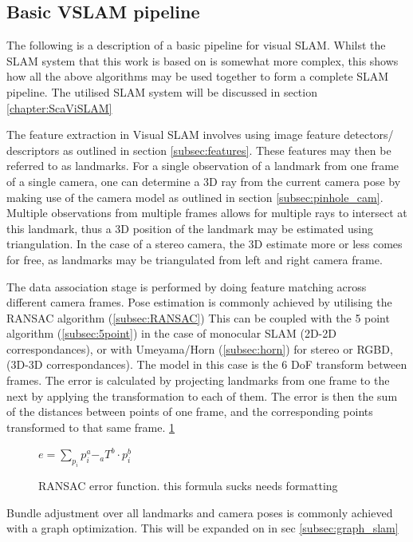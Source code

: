 \subsection{Basic VSLAM pipeline}

The following is a description of a basic pipeline for visual SLAM.  Whilst the SLAM system that
this work is based on is somewhat more complex, this shows how all the above algorithms may be used
together to form a complete SLAM pipeline.  The utilised SLAM system will be discussed in section
\ref{chapter:ScaViSLAM}

The feature extraction in Visual SLAM involves using image feature detectors/ descriptors as
outlined in section \ref{subsec:features}.  These features may then be referred to as
landmarks. For a single observation of a landmark from one frame of a single camera, one can
determine a 3D ray from the current camera pose by making use of the camera model as outlined in
section \ref{subsec:pinhole_cam}.  Multiple observations from multiple frames allows for multiple
rays to intersect at this landmark, thus a 3D position of the landmark may be estimated using
triangulation. In the case of a stereo camera, the 3D estimate more or less comes for free, as
landmarks may be triangulated from left and right camera frame.

The data association stage is performed by doing feature matching across different camera frames.
Pose estimation is commonly achieved by utilising the RANSAC algorithm (\ref{subsec:RANSAC}) 
This can be coupled with the 5 point algorithm (\ref{subsec:5point}) in the case of monocular SLAM
(2D-2D correspondances), or with Umeyama/Horn (\ref{subsec:horn}) for stereo or RGBD, (3D-3D
correspondances). The model in this case is the 6 DoF transform between frames. The error is
calculated by projecting landmarks from one frame to the next by applying the transformation to each
of them. The error is then the sum of the distances between points of one frame, and the
corresponding points transformed to that same frame. \ref{eq:ransac_error}

\begin{figure}
 \centering
 \begin{math}
  e = \sum\limits_{p_i} p^a_i - _aT^b \cdot p^b_i
 \end{math}
 \caption{RANSAC error function.  this formula sucks needs formatting}
 \label{eq:ransac_error}
\end{figure}


Bundle adjustment over all landmarks and camera poses is commonly achieved with a graph
optimization. This will be expanded on in sec \ref{subsec:graph_slam}

